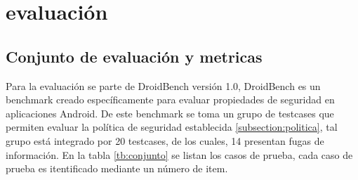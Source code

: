 \section{evaluación}
\subsection{Conjunto de evaluación y metricas}
Para la evaluación se parte de DroidBench versión
1.0\cite{DroidBenchBenchmarks}, DroidBench es un benchmark creado
específicamente para evaluar propiedades de seguridad en aplicaciones Android. 
De este benchmark se toma un grupo de testcases que permiten evaluar la política
de seguridad establecida \ref{subsection:politica}, tal grupo está integrado por
20 testcases, de los cuales, 14 presentan fugas de información. En la
tabla \ref{tb:conjunto} se listan los casos de prueba, cada caso de prueba es
itentificado mediante un número de item.

